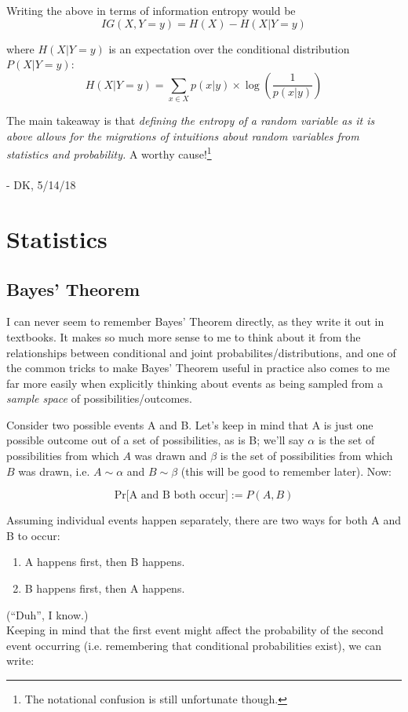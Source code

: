 \documentclass[letterpaper,12pt]{report}
\providecommand{\tightlist}{%
  \setlength{\itemsep}{0pt}\setlength{\parskip}{0pt}}
\begin{document}
Writing the above in terms of information entropy would be
\[ IG(X, Y = y) = H(X) - H(X|Y = y) \]


where \(H(X|Y = y)\) is an expectation over the conditional distribution 
\(P(X | Y = y)\):
\[
  H(X| Y = y) = \sum_{x \in X} p(x|y) \times \log\left(\frac{1}{p(x|y)}\right)
\]

The main takeaway is that \emph{defining the entropy of a random variable as it is above
allows for the migrations of intuitions about random variables
from statistics and probability.} A worthy cause!\footnote{The notational confusion is still unfortunate though.}
\\
\\
- DK, 5/14/18

\newpage
\chapter{Statistics}\label{statistics}
\section{Bayes' Theorem}\label{bayes-theorem}

I can never seem to remember Bayes' Theorem directly, as they write it
out in textbooks. It makes so much more sense to me to think about it
from the relationships between conditional and joint
probabilites/distributions, and one of the common tricks to make Bayes'
Theorem useful in practice also comes to me far more easily when
explicitly thinking about events as being sampled from a \emph{sample
space} of possibilities/outcomes.

Consider two possible events A and B. Let's keep in mind that A is just
one possible outcome out of a set of possibilities, as is B; we'll say
\(\alpha\) is the set of possibilities from which \(A\) was drawn and
\(\beta\) is the set of possibilities from which \(B\) was drawn, i.e.
\(A \sim \alpha\) and \(B \sim \beta\) (this will be good to remember
later). Now:

\[ \text{Pr[A and B both occur]} := P(A,B) \]

Assuming individual events happen separately, there are two ways for
both A and B to occur: 
\begin{enumerate}
  \tightlist
    \item
      A happens first, then B happens. 
    \item 
      B happens first, then A happens.
\end{enumerate}
(``Duh'', I know.)
\\
Keeping in mind that the first event might affect the probability of the
second event occurring (i.e. remembering that conditional probabilities
exist), we can write:
\end{document}
